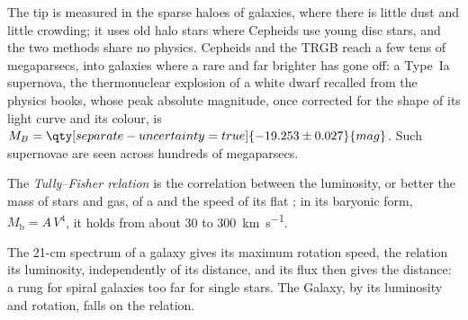 The tip is measured in the sparse haloes of galaxies, where there is
little dust and little crowding; it uses old halo stars where Cepheids use
young disc stars, and the two methods share no physics. Cepheids and the
TRGB reach a few tens of megaparsecs, into galaxies where a rare and far
brighter  has gone off: a Type~Ia supernova, the
thermonuclear explosion of a white dwarf recalled from the physics books,
whose peak absolute magnitude, once corrected for the
shape of its light curve and its colour, is
$M_B = \qty[separate-uncertainty=true]{-19.253 \pm 0.027}{mag}$. Such
supernovae are seen across hundreds of megaparsecs.

\begin{definition}\label{def:b3:milky-way-galaxies:tully-fisher}
The \emph{Tully--Fisher relation} is the
correlation between the luminosity, or better the mass of stars and gas,
of a  and the speed of its flat ; in its
baryonic form, $M_\mathrm{b} = A\,V^4$, it holds from about 30 to
\qty{300}{km.s^{-1}}.
\end{definition}

The 21-cm spectrum of a galaxy gives its maximum rotation speed, the
relation its luminosity, independently of its distance, and its flux
then gives the distance: a rung for spiral galaxies too far for single
stars. The Galaxy, by its luminosity and rotation, falls on the relation.

